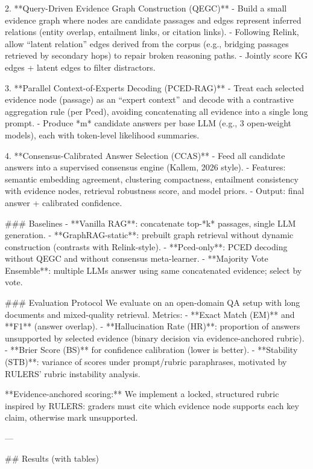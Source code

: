 2. **Query-Driven Evidence Graph Construction (QEGC)**  
   - Build a small evidence graph where nodes are candidate passages and edges represent inferred relations (entity overlap, entailment links, or citation links).  
   - Following Relink, allow “latent relation” edges derived from the corpus (e.g., bridging passages retrieved by secondary hops) to repair broken reasoning paths.  
   - Jointly score KG edges + latent edges to filter distractors.

3. **Parallel Context-of-Experts Decoding (PCED-RAG)**  
   - Treat each selected evidence node (passage) as an “expert context” and decode with a contrastive aggregation rule (per Pced), avoiding concatenating all evidence into a single long prompt.  
   - Produce *m* candidate answers per base LLM (e.g., 3 open-weight models), each with token-level likelihood summaries.

4. **Consensus-Calibrated Answer Selection (CCAS)**  
   - Feed all candidate answers into a supervised consensus engine (Kallem, 2026 style).  
   - Features: semantic embedding agreement, clustering compactness, entailment consistency with evidence nodes, retrieval robustness score, and model priors.  
   - Output: final answer + calibrated confidence.

### Baselines  
- **Vanilla RAG**: concatenate top-*k* passages, single LLM generation.  
- **GraphRAG-static**: prebuilt graph retrieval without dynamic construction (contrasts with Relink-style).  
- **Pced-only**: PCED decoding without QEGC and without consensus meta-learner.  
- **Majority Vote Ensemble**: multiple LLMs answer using same concatenated evidence; select by vote.

### Evaluation Protocol  
We evaluate on an open-domain QA setup with long documents and mixed-quality retrieval. Metrics:  
- **Exact Match (EM)** and **F1** (answer overlap).  
- **Hallucination Rate (HR)**: proportion of answers unsupported by selected evidence (binary decision via evidence-anchored rubric).  
- **Brier Score (BS)** for confidence calibration (lower is better).  
- **Stability (STB)**: variance of scores under prompt/rubric paraphrases, motivated by RULERS’ rubric instability analysis.

**Evidence-anchored scoring:** We implement a locked, structured rubric inspired by RULERS: graders must cite which evidence node supports each key claim, otherwise mark unsupported.

---

## Results (with tables)

